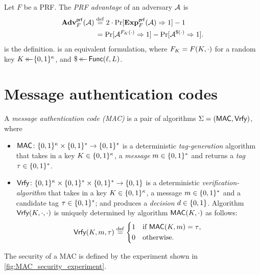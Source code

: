 \begin{definition}
Let $F$ be a PRF.
The \emph{PRF advantage} of an adversary $\mathcal{A}$ is
\begin{align}
	\mathbf{Adv}_{F}^{\mathsf{prf}}(\mathcal{A}) 
		&\overset{\mathrm{def}}{=} 2 \cdot \Pr[ \mathbf{Exp}_{F}^{\mathsf{prf}}(\mathcal{A}) \Rightarrow 1] - 1 \label{def:sec:prf:eq:definition}  \\ 
		&\hspace*{1.6pt}= \Pr[\mathcal{A}^{F_K(\cdot)} \Rightarrow 1] - \Pr[\mathcal{A}^{\$(\cdot)} \Rightarrow 1]. \label{def:sec:prf:eq:derived}
\end{align}
 is the definition.
 is an equivalent formulation,
where $F_K = F(K, \cdot)$ for a random key $K \operatorname{\leftarrow\mathrel{\mkern-14mu}\leftarrow} \lbrace 0, 1 \rbrace^\kappa$, and $\$ \operatorname{\leftarrow\mathrel{\mkern-14mu}\leftarrow} \mathsf{Func}(\ell, L)$. 

\end{definition}



\section{Message authentication codes}\label{sec:other_definitions:MAC}

A \emph{message authentication code (MAC)} is a pair of algorithms $\Sigma = (\mathsf{MAC}, \mathsf{Vrfy})$,
where
\begin{itemize}
	\item $\mathsf{MAC} \colon \lbrace 0, 1 \rbrace^\kappa \times \lbrace 0, 1 \rbrace^* \to \lbrace 0, 1 \rbrace^*$ is a deterministic \emph{tag-generation} algorithm that takes in a key $K \in \lbrace 0, 1 \rbrace^\kappa$, a \emph{message} $m \in \lbrace 0, 1 \rbrace^*$ and returns a \emph{tag} $\tau \in \lbrace 0, 1 \rbrace^*$.
	
	\item $\mathsf{Vrfy} \colon \lbrace 0, 1 \rbrace^\kappa \times \lbrace 0, 1 \rbrace^* \times \lbrace 0, 1 \rbrace^* \to \lbrace 0, 1 \rbrace$ is a deterministic \emph{verification-algorithm} that takes in a key $K \in \lbrace 0, 1 \rbrace^\kappa$, a message $m \in \lbrace 0, 1 \rbrace^*$ and a candidate tag $\tau \in \lbrace 0, 1 \rbrace^*$;
	and produces a \emph{decision} $d \in \lbrace 0, 1 \rbrace$.
	Algorithm $\mathsf{Vrfy}(K, \cdot, \cdot)$ is uniquely determined by algorithm $\mathsf{MAC}(K, \cdot)$ as follows:
	\begin{equation}
		\macvrfy(\Key, m, \tau) \defeq 
		\begin{cases*}
		1 & if $\mactag(\Key, m) = \tau$, \\
		0 & otherwise.
		\end{cases*}
	\end{equation}
	
\end{itemize}
The security of a MAC is defined by the experiment shown in \cref{fig:MAC_security_experiment}.

